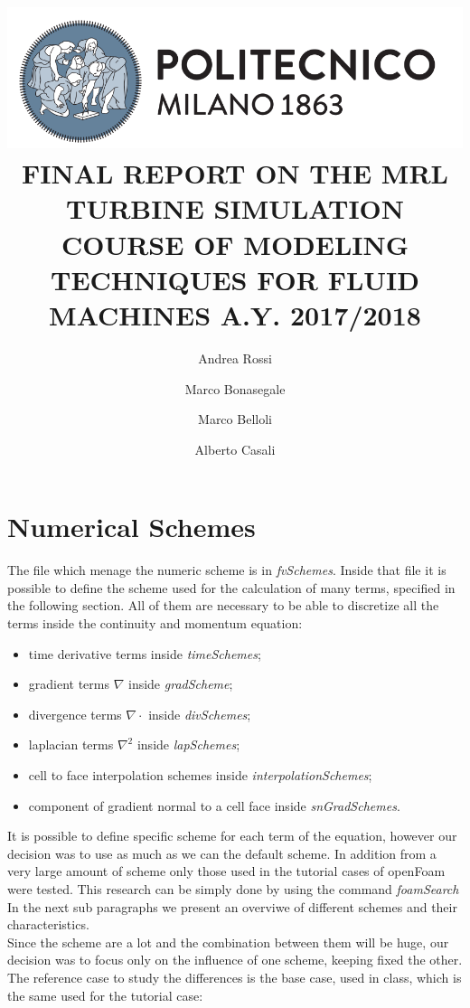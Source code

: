 \documentclass[a4paper,12pt]{article}
\title{
\includegraphics[scale=0.4]{images/logo.png}
\\[1cm]
FINAL REPORT ON THE  MRL TURBINE SIMULATION
COURSE OF MODELING TECHNIQUES FOR FLUID MACHINES 
A.Y. 2017/2018}
\author{
Andrea Rossi \and Marco Bonasegale
\and Marco Belloli \and Alberto Casali 
}
\date{}
\begin{document}

\newpage

\tableofcontents

\newpage




\section{Numerical Schemes}
The file which menage the numeric scheme is in \textit{fvSchemes}. Inside that file it is possible to define the scheme used for the calculation of many terms, specified in the following section. All of them are necessary to be able to discretize all the terms inside the continuity and momentum equation:
\begin{itemize} 
 \item time derivative terms inside \textit{timeSchemes};
 \item gradient terms $\nabla$ inside \textit{gradScheme};
 \item divergence terms $\nabla\cdot $ inside \textit{divSchemes};
 \item laplacian terms $\nabla^2$ inside \textit{lapSchemes};
 \item cell to face interpolation schemes  inside \textit{interpolationSchemes};
 \item component of gradient normal to a cell face  inside \textit{snGradSchemes}.
 \end{itemize} 
It is possible to define specific scheme for each term of the equation, however our decision was to use as much as we can the default scheme. In addition from a very large amount of scheme only those used in the tutorial cases of openFoam were tested. This research can be simply done by using the command \textit{foamSearch} 
In the next sub paragraphs we present an overviwe of different schemes and their characteristics.
\\ Since the scheme are a lot and the combination between them will be huge, our decision was to focus only on the influence of one scheme, keeping fixed the other. The reference case to study the differences is the base case, used in class, which is the same used for the tutorial case:
\end{document}
